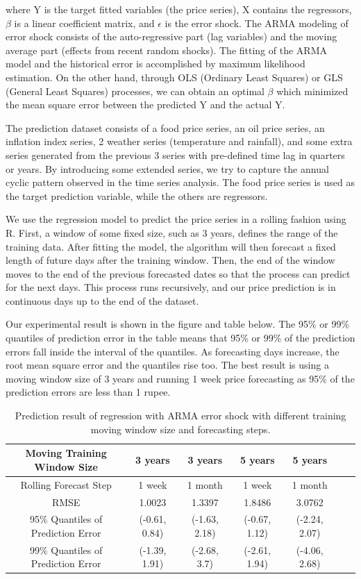 where Y is the target fitted variables (the price series), X contains the regressors, $\beta$ is a linear coefficient matrix, and $\epsilon$ is the error shock. The ARMA modeling of error shock consists of the auto-regressive part (lag variables) and the moving average part (effects from recent random shocks). The fitting of the ARMA model and the historical error is accomplished by maximum likelihood estimation. On the other hand, through OLS (Ordinary Least Squares) or GLS (General Least Squares) processes, we can obtain an optimal $\beta$ which minimized the mean square error between the predicted Y and the actual Y.

The prediction dataset consists of a food price series, an oil price series, an inflation index series, 2 weather series (temperature and rainfall), and some extra series generated from the previous 3 series with pre-defined time lag in quarters or years. By introducing some extended series, we try to capture the annual cyclic pattern observed in the time series analysis. The food price series is used as the target prediction variable, while the others are regressors.

We use the regression model to predict the price series in a rolling fashion using R. First, a window of some fixed size, such as 3 years, defines the range of the training data. After fitting the model, the algorithm will then forecast a fixed length of future days after the training window. Then, the end of the window moves to the end of the previous forecasted dates so that the process can predict for the next days. This process runs recursively, and our price prediction is in continuous days up to the end of the dataset.

Our experimental result is shown in the figure and table below. The 95\% or 99\% quantiles of prediction error in the table means that 95\% or 99\% of the prediction errors fall inside the interval of the quantiles. As forecasting days increase, the root mean square error and the quantiles rise too. The best result is using a moving window size of 3 years and running 1 week price forecasting as 95\% of the prediction errors are less than 1 rupee.

\begin{table}[h]
\begin{tabular}{|c|c|c|c|c|c|c|}
\hline
\hspace{5pt} Moving Training Window Size & 3 years & 3 years & 5 years & 5 years  \\ \hline
Rolling Forecast Step & 1 week & 1 month & 1 week & 1 month  \\ \hline
RMSE & 1.0023 & 1.3397 & 1.8486 & 3.0762 \\ \hline
95\% Quantiles of Prediction Error & (-0.61, 0.84) & (-1.63, 2.18) & (-0.67, 1.12) & (-2.24, 2.07) \\ \hline
99\% Quantiles of Prediction Error & (-1.39, 1.91) & (-2.68, 3.7) & (-2.61, 1.94) & (-4.06, 2.68)  \\ \hline
\end{tabular}
\label{table:time series prediction results}
\caption{Prediction result of regression with ARMA error shock with different training moving window size and forecasting steps.}
\end{table}

